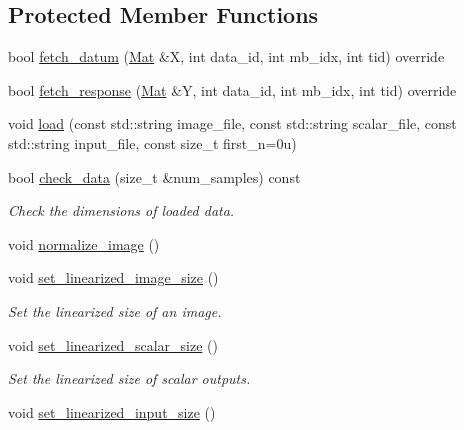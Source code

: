 \subsection*{Protected Member Functions}
\begin{DoxyCompactItemize}
\item 
bool \hyperlink{classlbann_1_1data__reader__jag_a3b22313694b8ff258486491775100d89}{fetch\+\_\+datum} (\hyperlink{base_8hpp_a68f11fdc31b62516cb310831bbe54d73}{Mat} \&X, int data\+\_\+id, int mb\+\_\+idx, int tid) override
\item 
bool \hyperlink{classlbann_1_1data__reader__jag_ad9b4259f23a9744ec1c86c688a67f583}{fetch\+\_\+response} (\hyperlink{base_8hpp_a68f11fdc31b62516cb310831bbe54d73}{Mat} \&Y, int data\+\_\+id, int mb\+\_\+idx, int tid) override
\item 
void \hyperlink{classlbann_1_1data__reader__jag_a300a937eb6022b5b2cd6d9405beb3d83}{load} (const std\+::string image\+\_\+file, const std\+::string scalar\+\_\+file, const std\+::string input\+\_\+file, const size\+\_\+t first\+\_\+n=0u)
\item 
bool \hyperlink{classlbann_1_1data__reader__jag_a2f6bcf33c1efdcef1c0cc0ac9756968b}{check\+\_\+data} (size\+\_\+t \&num\+\_\+samples) const
\begin{DoxyCompactList}\small\item\em Check the dimensions of loaded data. \end{DoxyCompactList}\item 
void \hyperlink{classlbann_1_1data__reader__jag_ad145def7b548ca2d0d3f207f6376b114}{normalize\+\_\+image} ()
\item 
void \hyperlink{classlbann_1_1data__reader__jag_af1e7add9e8bdcf97fe81bfc27b618387}{set\+\_\+linearized\+\_\+image\+\_\+size} ()
\begin{DoxyCompactList}\small\item\em Set the linearized size of an image. \end{DoxyCompactList}\item 
void \hyperlink{classlbann_1_1data__reader__jag_a27a1da4475453b043ba0ec1724317c27}{set\+\_\+linearized\+\_\+scalar\+\_\+size} ()
\begin{DoxyCompactList}\small\item\em Set the linearized size of scalar outputs. \end{DoxyCompactList}\item 
void \hyperlink{classlbann_1_1data__reader__jag_a15f9aab2180ff66b7b5ace00957740df}{set\+\_\+linearized\+\_\+input\+\_\+size} ()

\end{DoxyCompactItemize}
